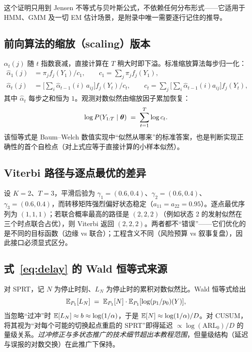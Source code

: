 \begin{remark}
这个证明只用到 Jensen 不等式与贝叶斯公式，不依赖任何分布形式——它适用于 HMM、GMM 及一切 EM 估计场景，是附录中唯一需要逐行记住的推导。
\end{remark}

\subsection{前向算法的缩放（scaling）版本}

$\alpha_t(j)$ 随 $t$ 指数衰减，直接计算在 $T$ 稍大时即下溢。标准缩放算法每步归一化：
\begin{align}
\hat\alpha_1(j) &= \pi_j f_j(Y_1) / c_1, \qquad c_1 = \sum_j \pi_j f_j(Y_1), \\
\hat\alpha_t(j) &= \Big[\sum_i \hat\alpha_{t-1}(i)\, a_{ij}\Big] f_j(Y_t) \Big/ c_t, \qquad
c_t = \sum_j \Big[\sum_i \hat\alpha_{t-1}(i) a_{ij}\Big] f_j(Y_t),
\end{align}
其中 $\hat\alpha_t$ 每步之和恒为 $1$。观测对数似然由缩放因子累加恢复：
\begin{equation}
\log P(Y_{1:T} \mid \bm{\theta}) \;=\; \sum_{t=1}^{T} \log c_t .
\end{equation}
该恒等式是 Baum--Welch 数值实现中“似然从哪来”的标准答案，也是判断实现正确性的首个自检点（对上式应等于直接计算的小样本似然）。

\subsection{Viterbi 路径与逐点最优的差异}

\begin{example}
设 $K=2$、$T=3$，平滑后验为 $\gamma_1 = (0.6, 0.4)$、$\gamma_2 = (0.6, 0.4)$、$\gamma_3 = (0.6, 0.4)$，而转移矩阵强烈偏好状态稳定（$a_{11} = a_{22} = 0.95$）。逐点最优序列为 $(1,1,1)$；若联合概率最高的路径是 $(2,2,2)$（例如状态 2 的发射似然在三个时点联合占优），则 Viterbi 返回 $(2,2,2)$。两者都不“错误”——它们优化的是不同的目标函数（边缘 vs 联合）；工程含义不同（风险预算 vs 叙事复盘），因此接口必须显式区分。
\end{example}

\subsection{式~\texorpdfstring{\eqref{eq:delay}}{\ref{eq:delay}} 的 Wald 恒等式来源}

对 SPRT，记 $N$ 为停止时刻、$L_N$ 为停止时的累积对数似然比。Wald 恒等式给出
\begin{equation}
\mathbb{E}_{P_1}[L_N] \;=\; \mathbb{E}_{P_1}[N] \cdot \mathbb{E}_{P_1}[\log (p_1/p_0)(Y)],
\end{equation}
当忽略“过冲”时 $\mathbb{E}[L_N] \approx b \approx \log(1/\alpha)$，于是 $\mathbb{E}[N] \approx \log(1/\alpha)/D$。对 CUSUM，将其视为“对每个可能的切换起点重启的 SPRT”即得延迟 $\propto \log(\mathrm{ARL}_0)/D$ 的量级关系。\emph{过冲修正与多状态推广的技术细节超出本教程范围}，但量级结构（延迟与误报的对数交换）在此推广下保持。

